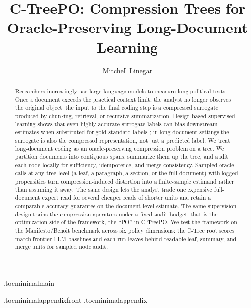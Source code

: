 \documentclass[11pt]{article}
\title{C-TreePO: Compression Trees for Oracle-Preserving Long-Document Learning}
\author{Mitchell Linegar}
\date{}
\begin{document}
\maketitle

\begin{abstract}
Researchers increasingly use large language models to measure long
political texts. Once a document exceeds the practical context
limit, the analyst no longer observes the original object: the
input to the final coding step is a compressed surrogate produced by
chunking, retrieval, or recursive summarization. Design-based
supervised learning shows that even highly accurate surrogate labels
can bias downstream estimates when substituted for gold-standard
labels \citep{EgamiEtAl2024}; in long-document settings the
surrogate is also the compressed representation, not just a
predicted label. We treat long-document coding as an
oracle-preserving compression problem on a tree. We partition
documents into contiguous spans, summarize them up the tree, and
audit each node locally for sufficiency, idempotence, and merge
consistency. Sampled oracle calls at any tree level (a leaf, a
paragraph, a section, or the full document) with logged propensities
turn compression-induced distortion into a finite-sample estimand
rather than assuming it away. The same design lets the analyst trade
one expensive full-document expert read for several cheaper reads of
shorter units and retain a comparable accuracy guarantee on the
document-level estimate. The same supervision design trains the
compression operators under a fixed audit budget; that is the
optimization side of the framework, the ``PO'' in C-TreePO. We test
the framework on the Manifesto/Benoit benchmark across six policy
dimensions: the C-Tree root scores match frontier LLM baselines and
each run leaves behind readable leaf, summary, and merge units for
sampled node audit.
\end{abstract}

\tableofcontents
\clearpage

\etocdepthtag.toc{minimalmain}











\appendix
\etocdepthtag.toc{minimalappendixfront}
\appendixcontents
\etocdepthtag.toc{minimalappendix}










\clearpage


\end{document}

